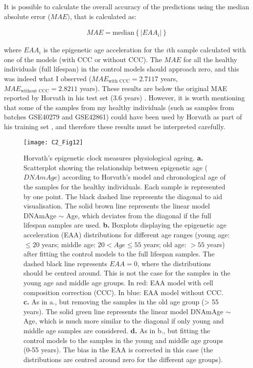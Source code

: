 It is possible to calculate the overall accuracy of the predictions using the median absolute error ($MAE)$, that is calculated as:

\begin{align}
 	MAE = \mathrm{median}\left\{|EAA_i|\right\}
\end{align}

where $EAA_i$ is the epigenetic age acceleration for the $i$th sample calculated with one of the models (with CCC or without CCC). The $MAE$ for all the healthy individuals (full lifespan) in the control models should approach zero, and this was indeed what I observed ($MAE_{\text{with CCC}} = 2.7117$ years, $MAE_{\text{without CCC}} = 2.8211$ years). These results are below the original MAE reported by Horvath in his test set (3.6 years) \citep{Horvath2013}. However, it is worth mentioning that some of the samples from my healthy individuals (such as samples from batches GSE40279 and GSE42861) could have been used by Horvath as part of his training set \citep{Horvath2013}, and therefore these results must be interpreted carefully. 

\begin{figure}[htbp!] 
	\centering
	\texttt{[image: C2\_Fig12]}
	\vspace*{2mm}    
	\caption[Horvath's epigenetic clock measures physiological ageing]{Horvath's epigenetic clock measures physiological ageing. \textbf{a.} Scatterplot showing the relationship between epigenetic age ($DNAmAge$) according to Horvath’s model \citep{Horvath2013} and chronological age of the samples for the healthy individuals. Each sample is represented by one point. The black dashed line represents the diagonal to aid visualisation. The solid brown line represents the linear model DNAmAge $\sim$ Age, which deviates from the diagonal if the full lifespan samples are used. \textbf{b.} Boxplots displaying the epigenetic age acceleration (EAA) distributions for different age ranges (young age: $\leq 20$ years; middle age: $20 < Age \leq 55$ years; old age: $> 55$ years) after fitting the control models to the full lifespan samples. The dashed black line represents $EAA = 0$, where the distributions should be centred around. This is not the case for the samples in the young age and middle age groups. In red: EAA model with cell composition correction (CCC). In blue: EAA model without CCC. \textbf{c.} As in a., but removing the samples in the old age group (> 55 years). The solid green line represents the linear model DNAmAge $\sim$ Age, which is much more similar to the diagonal if only young and middle age samples are considered. \textbf{d.} As in b., but fitting the control models to the samples in the young and middle age groups (0-55 years). The bias in the EAA is corrected in this case (the distributions are centred around zero for the different age groups).}
	\label{fig:c2_fig12}
\end{figure}   

